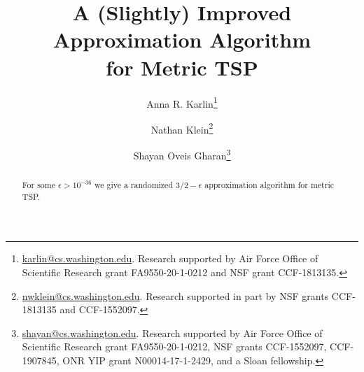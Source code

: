 \documentclass[11pt]{article}
\title{A (Slightly) Improved Approximation Algorithm\\ for Metric TSP}
\author{Anna R. Karlin\thanks{\href{mailto:karlin@cs.washington.edu}{karlin@cs.washington.edu}. Research supported by Air Force Office of Scientific Research grant FA9550-20-1-0212 and NSF grant CCF-1813135.}}
\author{Nathan Klein\thanks{\href{mailto:nwklein@cs.washington.edu}{nwklein@cs.washington.edu}. Research supported in part by NSF grants CCF-1813135 and CCF-1552097.}}
\author{Shayan Oveis Gharan\thanks{\href{mailto:shayan@cs.washington.edu}{shayan@cs.washington.edu}. Research supported by Air Force Office of Scientific Research grant FA9550-20-1-0212, NSF grants  CCF-1552097, CCF-1907845,  ONR YIP grant N00014-17-1-2429, and a Sloan fellowship.}}
\affil{University of Washington}
\theoremstyle{plain}
\theoremstyle{remark}
\def\eps{{\epsilon}}
\begin{document}
\maketitle 
\begin{abstract}
For some $\eps > 10^{-36}$ we give a randomized $3/2-\eps$ approximation algorithm for metric TSP.
\end{abstract}
\thispagestyle{empty} 

\newpage
\tableofcontents
\thispagestyle{empty}

\newpage 
\setcounter{page}{1}
















\printbibliography
%
%


\appendix


\end{document}
